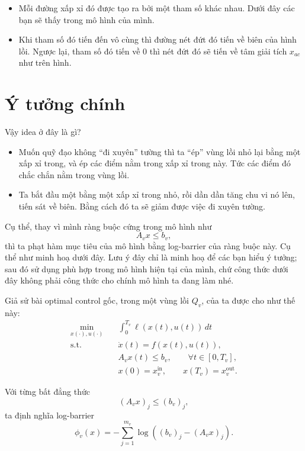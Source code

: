 \documentclass[12pt,a4paper]{article}
\begin{document}
\begin{itemize}
    \item Mỗi đường xấp xỉ đó được tạo ra bởi một tham số khác nhau. Dưới đây các bạn sẽ thấy trong mô hình của mình.
    \item Khi tham số đó tiến đến vô cùng thì đường nét đứt đó tiến về biên của hình lồi. Ngược lại, tham số đó tiến về 0 thì nét đứt đó sẽ tiến về tâm giải tích $x_{ac}$ như trên hình.
\end{itemize}

\section*{Ý tưởng chính}

Vậy idea ở đây là gì?

\begin{itemize}
    \item Muốn quỹ đạo không ``đi xuyên'' tường thì ta ``ép'' vùng lồi nhỏ lại bằng một xấp xỉ trong, và ép các điểm nằm trong xấp xỉ trong này. Tức các điểm đó chắc chắn nằm trong vùng lồi.
    \item Ta bắt đầu một bằng một xấp xỉ trong nhỏ, rồi dần dần tăng chu vi nó lên, tiến sát về biên. Bằng cách đó ta sẽ giảm được việc đi xuyên tường.
\end{itemize}

Cụ thể, thay vì mình ràng buộc cứng trong mô hình như
\[
    A_v x \leq b_v,
\]
thì ta phạt hàm mục tiêu của mô hình bằng log-barrier của ràng buộc này. Cụ thể như minh hoạ dưới đây. Lưu ý đây chỉ là minh hoạ để các bạn hiểu ý tưởng; sau đó sử dụng phù hợp trong mô hình hiện tại của mình, chứ công thức dưới đây không phải công thức cho chính mô hình ta đang làm nhé.

Giả sử bài optimal control gốc, trong một vùng lồi $Q_v$, của ta được cho như thế này:
\[
\begin{aligned}
    \min_{x(\cdot),u(\cdot)} \quad & \int_{0}^{T_v} \ell(x(t),u(t))\,dt \\
    \text{s.t.} \quad & \dot{x}(t) = f(x(t),u(t)), \\
    & A_v x(t) \leq b_v, \qquad \forall t \in [0,T_v], \\
    & x(0) = x_v^{\mathrm{in}}, \qquad x(T_v) = x_v^{\mathrm{out}}.
\end{aligned}
\]

Với từng bất đẳng thức
\[
    (A_v x)_j \leq (b_v)_j,
\]
ta định nghĩa log-barrier
\[
    \phi_v(x) = - \sum_{j=1}^{m_v} \log\left((b_v)_j - (A_v x)_j\right).
\]
\end{document}
